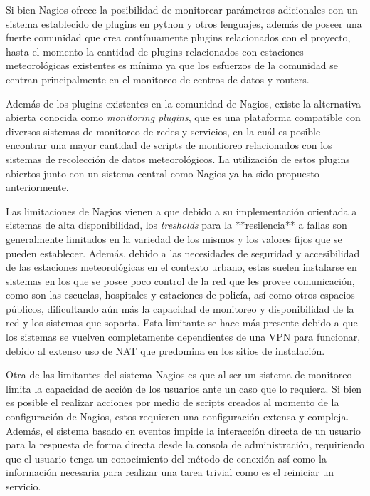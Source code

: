 Si bien Nagios ofrece la posibilidad de monitorear parámetros adicionales con un sistema establecido de plugins en python y otros lenguajes, además de poseer una fuerte comunidad que crea contínuamente plugins relacionados con el proyecto, hasta el momento la cantidad de plugins relacionados con estaciones meteorológicas existentes es mínima ya que los esfuerzos de la comunidad se centran principalmente en el monitoreo de centros de datos y routers.

Además de los plugins existentes en la comunidad de Nagios, existe la alternativa abierta conocida como \textit{monitoring plugins}\cite{monitoring_plugins}, que es una plataforma compatible con diversos sistemas de monitoreo de redes y servicios, en la cuál es posible encontrar una mayor cantidad de scripts de montioreo relacionados con los sistemas de recolección de datos meteorológicos. La utilización de estos plugins abiertos junto con un sistema central como Nagios ya ha sido propuesto anteriormente\cite{monitoreo_raspberry_nagios}.

Las limitaciones de Nagios vienen a que debido a su implementación orientada a sistemas de alta disponibilidad, los \textit{tresholds} para la **resilencia** a fallas son generalmente limitados en la variedad de los mismos y los valores fijos que se pueden establecer. Además, debido a las necesidades de seguridad y accesibilidad de las estaciones meteorológicas en el contexto urbano, estas suelen instalarse en sistemas en los que se posee poco control de la red que les provee comunicación, como son las escuelas, hospitales y estaciones de policía, así como otros espacios públicos\cite{muller_sensors_and_the_city}, dificultando aún más la capacidad de monitoreo y disponibilidad de la red y los sistemas que soporta. Esta limitante se hace más presente debido a que los sistemas se vuelven completamente dependientes de una VPN para funcionar, debido al extenso uso de NAT que predomina en los sitios de instalación.

Otra de las limitantes del sistema Nagios es que al ser un sistema de monitoreo limita la capacidad de acción de los usuarios ante un caso que lo requiera. Si bien es posible el realizar acciones por medio de scripts creados al momento de la configuración de Nagios, estos requieren una configuración extensa y compleja\cite{nagios_service_restart}. Además, el sistema basado en eventos impide la interacción directa de un usuario para la respuesta de forma directa desde la consola de administración, requiriendo que el usuario tenga un conocimiento del método de conexión así como la información necesaria para realizar una tarea trivial como es el reiniciar un servicio.

